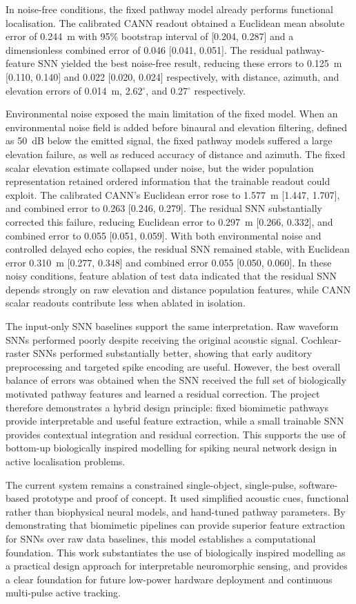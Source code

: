 In noise-free conditions, the fixed pathway model already performs functional localisation. The calibrated CANN readout obtained a Euclidean mean absolute error of 0.244~m with 95\% bootstrap interval of [0.204, 0.287] and a dimensionless combined error of 0.046 [0.041, 0.051]. The residual pathway-feature SNN yielded the best noise-free result, reducing these errors to 0.125~m [0.110, 0.140] and 0.022 [0.020, 0.024] respectively, with distance, azimuth, and elevation errors of 0.014~m, 2.62$^\circ$, and 0.27$^\circ$ respectively.

Environmental noise exposed the main limitation of the fixed model. When an environmental noise field is added before binaural and elevation filtering, defined as 50~dB below the emitted signal, the fixed pathway models suffered a large elevation failure, as well as reduced accuracy of distance and azimuth. The fixed scalar elevation estimate collapsed under noise, but the wider population representation retained ordered information that the trainable readout could exploit. The calibrated CANN's Euclidean error rose to 1.577~m [1.447, 1.707], and combined error to 0.263 [0.246, 0.279]. The residual SNN substantially corrected this failure, reducing Euclidean error to 0.297~m [0.266, 0.332], and combined error to 0.055 [0.051, 0.059]. With both environmental noise and controlled delayed echo copies, the residual SNN remained stable, with Euclidean error 0.310~m [0.277, 0.348] and combined error 0.055 [0.050, 0.060]. In these noisy conditions, feature ablation of test data indicated that the residual SNN depends strongly on raw elevation and distance population features, while CANN scalar readouts contribute less when ablated in isolation.

The input-only SNN baselines support the same interpretation. Raw waveform SNNs performed poorly despite receiving the original acoustic signal. Cochlear-raster SNNs performed substantially better, showing that early auditory preprocessing and targeted spike encoding are useful. However, the best overall balance of errors was obtained when the SNN received the full set of biologically motivated pathway features and learned a residual correction. The project therefore demonstrates a hybrid design principle: fixed biomimetic pathways provide interpretable and useful feature extraction, while a small trainable SNN provides contextual integration and residual correction. This supports the use of bottom-up biologically inspired modelling for spiking neural network design in active localisation problems.

The current system remains a constrained single-object, single-pulse, software-based prototype and proof of concept. It used simplified acoustic cues, functional rather than biophysical neural models, and hand-tuned pathway parameters. By demonstrating that biomimetic pipelines can provide superior feature extraction for SNNs over raw data baselines, this model establishes a computational foundation. This work substantiates the use of biologically inspired modelling as a practical design approach for interpretable neuromorphic sensing, and provides a clear foundation for future low-power hardware deployment and continuous multi-pulse active tracking.

